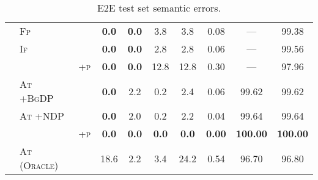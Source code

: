 \begin{table*}[t!]
\begin{tabular}{lll c c c c  c c c}
&\textsc{Fp} & &\textbf{  0.0}&\textbf{  0.0}&3.8&3.8&0.08&---&99.38 \\
&\textsc{If} & &\textbf{  0.0}&\textbf{  0.0}&2.8&2.8&0.06&---&99.56 \\
&  & \textsc{+p}&\textbf{  0.0}&\textbf{  0.0}&12.8&12.8&0.30&---&97.96 \\
&\textsc{At +BgDP} & &\textbf{  0.0}&2.2&0.2&2.4&0.06&99.62&99.62 \\
&\textsc{At +NDP} & &\textbf{  0.0}&2.0&0.2&2.2&0.04&99.64&99.64 \\
&  & \textsc{+p}&\textbf{  0.0}&\textbf{  0.0}&\textbf{  0.0}&\textbf{  0.0}&\textbf{ 0.00}&\textbf{100.00}&\textbf{100.00} \\
&\textsc{At (Oracle)} & &18.6&2.2&3.4&24.2&0.54&96.70&96.80 \\
\midrule
\end{tabular}



\caption{E2E test set semantic errors.}
\label{app:e2e.sem}
\end{table*}
